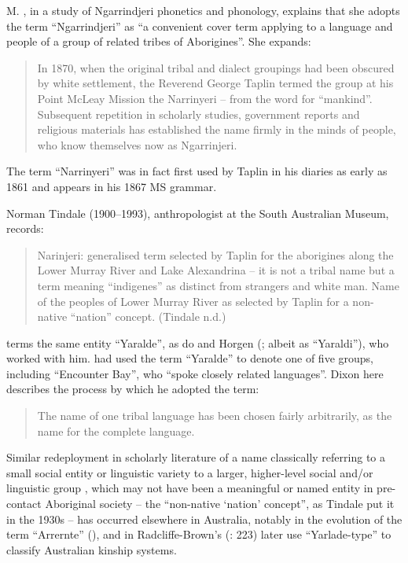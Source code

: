 M. \citet[11]{McDonald2002}, in a study of Ngarrindjeri phonetics and phonology, explains that she adopts the term “Ngarrindjeri” as ``a convenient cover term applying to a language and people of a group of related tribes of Aborigines''. She expands:

\begin{quote}
	In 1870, when the original tribal and dialect groupings had been obscured by white settlement, the Reverend George Taplin termed the group at his Point McLeay Mission the Narrinyeri – from the word for ``mankind''. Subsequent repetition in scholarly studies, government reports and religious materials has established the name firmly in the minds of people, who know themselves now as Ngarrinjeri. \citep[11]{McDonald2002}
\end{quote}

The term “Narrinyeri” was in fact first used by Taplin in his diaries as early as 1861 \citep[65]{Lane1997} and appears in his 1867 MS grammar.

Norman Tindale (1900--1993), anthropologist at the South Australian Museum, records:

\begin{quote}
	Narinjeri: generalised term selected by Taplin for the aborigines along the Lower Murray River and Lake Alexandrina – it is not a tribal name but a term meaning “indigenes” as distinct from strangers and white man. Name of the peoples of Lower Murray River as selected by Taplin for a non-native “nation” concept. (Tindale n.d.)
\end{quote}

\citet[241]{Dixon1980} terms the same entity ``Yaralde'', as do \citet{McDonald2002} and Horgen (\citeyear{Horgen2004}; albeit as ``Yaraldi''), who worked with him. \citet[227]{Radcliffe-Brown1918} had used the term “Yaralde” to denote one of five groups, including ``Encounter Bay'', who ``spoke closely related languages''. Dixon here describes the process by which he adopted the term:

\begin{quote}
	The name of one tribal language has been chosen fairly arbitrarily, as the name for the complete language. \citep[241]{Dixon1980}
\end{quote}

Similar redeployment in scholarly literature of a name classically referring to a small social entity or linguistic variety to a larger, higher-level social and/or linguistic group , which may not have been a meaningful or named entity in pre-contact Aboriginal society – the “non-native `nation' concept'', as Tindale put it in the 1930s – has occurred elsewhere in Australia, notably in the evolution of the term “Arrernte” (\citealt{Stockigt2021a}), and in Radcliffe-Brown’s (\citeyear{Radcliffe1030}: 223) later use “Yarlade-type” to classify Australian kinship systems.

